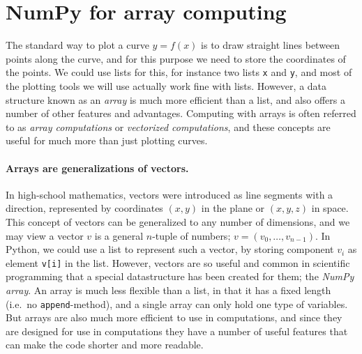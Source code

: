 \documentclass[graybox,envcountchap,sectrefs,final]{svmonodo}
\begin{document}
\section{NumPy for array computing}

The standard way to plot a curve $y=f(x)$ is to draw straight lines between
points along the curve, and for this purpose we need to store the coordinates of the points.
We could use lists for this, for instance two lists \texttt{x} and \texttt{y}, and most of the plotting tools
we will use actually work fine with lists. However, a data structure known as an \emph{array} is much more
efficient than a list, and also offers a number of other features and advantages. Computing
with arrays is often referred to as \emph{array computations} or \emph{vectorized computations}, and these concepts
are useful for much more than just plotting curves.

\paragraph{Arrays are generalizations of vectors.}
In high-school mathematics, vectors were introduced as line segments with a direction, represented by coordinates
$(x,y)$ in the plane or $(x,y,z)$ in space. This concept of vectors can be generalized to any number of dimensions,
and we may view a vector $v$ is a general $n$-tuple of numbers; $v=(v_0,\ldots,v_{n-1})$. In Python, we could use
a list to represent such a vector, by storing component $v_i$ as element \texttt{v[i]} in the list. However, vectors
are so useful and common in scientific programming that a special
datastructure has been created for them; the \emph{NumPy array}. An array is much less flexible than a list, in that it
has a fixed length (i.e.~no \texttt{append}-method), and a single array can only hold one type of variables.
But arrays are also much more efficient to use in computations, and since they are designed for use in
computations they have a number of useful features that can make the code shorter and more readable.
\end{document}
